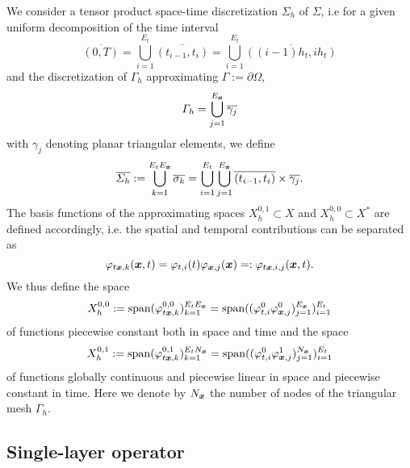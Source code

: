\documentclass[a4paper,11pt]{article}
\begin{document}
We consider a tensor product space-time discretization $\Sigma_h$ of $\Sigma$, i.e for a given uniform decomposition of the time interval
\begin{equation*}
  \overline{(0,T)} = \bigcup_{i=1}^{E_t} \overline{(t_{i-1}, t_i)} = \bigcup_{i=1}^{E_t} \overline{((i-1)h_t, i h_t)}
\end{equation*}
and the discretization of $\Gamma_h$ approximating $\Gamma := \partial\Omega$,
\begin{equation*}
  \Gamma_h = \bigcup_{j=1}^{E_{{\bm{x}}}} \overline{\gamma_j}
\end{equation*}
with $\gamma_j$ denoting planar triangular elements, we define
\begin{equation*}
  \overline{\Sigma_h} := \bigcup_{k=1}^{E_t E_{{{\bm{x}}}}} \overline{\sigma_k} = \bigcup_{i=1}^{E_t} \bigcup_{j=1}^{E_{{\bm{x}}}} \overline{(t_{i-1}, t_i)} \times \overline{\gamma_j}.
\end{equation*}
The basis functions of the approximating spaces $X_h^{0,1} \subset X$ and $X_h^{0,0} \subset X^\ast$ are defined accordingly, i.e. the spatial and temporal contributions can be separated as 
\begin{equation*}
  \varphi_{t{{\bm{x}}},k}({{\bm{x}}},t) = \varphi_{t,i} (t) \varphi_{{{\bm{x}}},j} ({{\bm{x}}}) =: \varphi_{t{{\bm{x}}},i,j}({{\bm{x}}},t). 
\end{equation*}
We thus define the space 
\begin{equation*}
  X_h^{0,0} := \operatorname{span} (\varphi^{0,0}_{t{{\bm{x}}},k})_{k=1}^{E_t E_{{{\bm{x}}}}} = \operatorname{span} ((\varphi^0_{t,i}\varphi^0_{{{\bm{x}}},j})_{j=1}^{E_{{{\bm{x}}}}})_{i=1}^{E_t}
\end{equation*}
of functions piecewise constant both in space and time and the space  
\begin{equation*}
  X_h^{0,1} := \operatorname{span} (\varphi^{0,1}_{t{{\bm{x}}},k})_{k=1}^{E_t N_{{\bm{x}}}} = \operatorname{span} ((\varphi^0_{t,i}\varphi^1_{{{\bm{x}}},j})_{j=1}^{N_{{{\bm{x}}}}})_{i=1}^{E_t}
\end{equation*} 
of functions globally continuous and piecewise linear in space and piecewise constant in time. Here we denote by $N_{{\bm{x}}}$ the number of nodes of the triangular mesh $\Gamma_h$.

\subsection{Single-layer operator}
\end{document}
